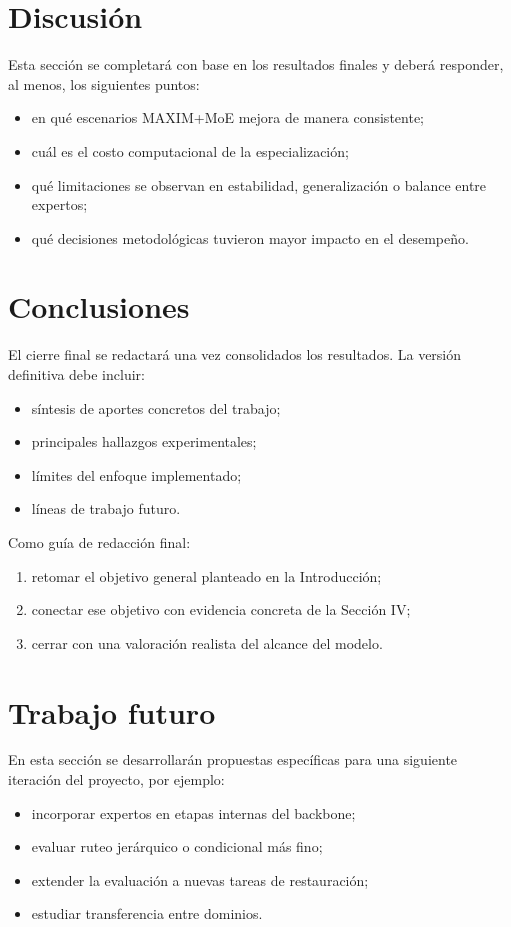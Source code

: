\documentclass[aps,prl,twocolumn,groupedaddress]{revtex4-2}
\begin{document}
\section{Discusión}

Esta sección se completará con base en los resultados finales y deberá responder, al menos, los siguientes puntos:
\begin{itemize}
    \item en qué escenarios MAXIM+MoE mejora de manera consistente;
    \item cuál es el costo computacional de la especialización;
    \item qué limitaciones se observan en estabilidad, generalización o balance entre expertos;
    \item qué decisiones metodológicas tuvieron mayor impacto en el desempeño.
\end{itemize}

\section{Conclusiones}

El cierre final se redactará una vez consolidados los resultados. La versión definitiva debe incluir:
\begin{itemize}
    \item síntesis de aportes concretos del trabajo;
    \item principales hallazgos experimentales;
    \item límites del enfoque implementado;
    \item líneas de trabajo futuro.
\end{itemize}

Como guía de redacción final:
\begin{enumerate}
    \item retomar el objetivo general planteado en la Introducción;
    \item conectar ese objetivo con evidencia concreta de la Sección IV;
    \item cerrar con una valoración realista del alcance del modelo.
\end{enumerate}

\section{Trabajo futuro}

En esta sección se desarrollarán propuestas específicas para una siguiente iteración del proyecto, por ejemplo:
\begin{itemize}
    \item incorporar expertos en etapas internas del backbone;
    \item evaluar ruteo jerárquico o condicional más fino;
    \item extender la evaluación a nuevas tareas de restauración;
    \item estudiar transferencia entre dominios.
\end{itemize}
\end{document}
